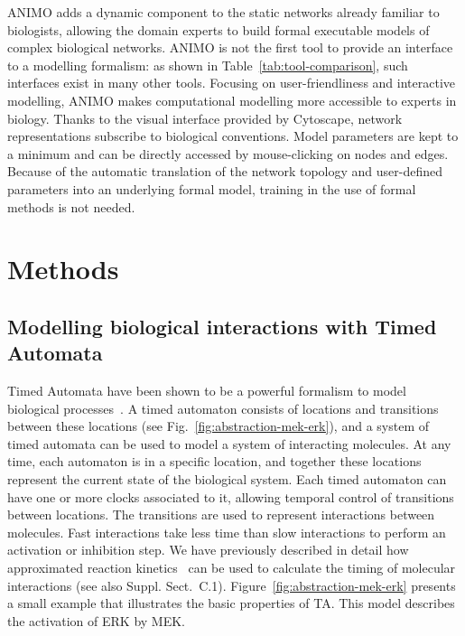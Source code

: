\documentclass{bmcart}
\def\ta{Timed Automaton}
\def\tas{Timed Automata}
\begin{document}
ANIMO adds a dynamic component to the static networks already familiar to biologists,
allowing the domain experts to build formal executable models of complex biological networks.
ANIMO is not the first tool to provide an interface to a
modelling formalism: as shown in Table~\ref{tab:tool-comparison}, such interfaces exist in many other tools.
Focusing on user-friendliness and interactive modelling, ANIMO
makes computational modelling more accessible to experts in biology.
Thanks to the visual
interface provided by Cytoscape, network representations subscribe to biological conventions.
Model parameters are kept to a minimum and can be directly accessed by mouse-clicking on
nodes and edges. Because of the automatic translation of the network topology and
user-defined parameters into an underlying formal model, training in the use of formal methods
is not needed.







\section*{Methods}

\subsection*{Modelling biological interactions with Timed Automata}\label{subsec:timed-automata}
\def\ta{TA}
\def\tas{TA}

Timed Automata have been shown to be a powerful formalism to model biological
processes~\cite{ta-siebert,bartocci-oscillators,oded-ode-ta-discretization}. A timed automaton consists of locations
and transitions between these locations (see Fig.~\ref{fig:abstraction-mek-erk}), and a system of timed automata can be
used to model a system of interacting molecules. At any time, each automaton is in a specific location, and together
these locations represent the current state of the biological system. Each timed automaton can have one or more clocks
associated to it, allowing temporal control of transitions between locations. The transitions are used to
represent interactions between molecules. Fast interactions take less time than slow interactions
to perform an activation or inhibition step. We have previously described in detail how approximated
reaction kinetics~\cite{animo-ieee} can be used to calculate the timing of molecular
interactions (see also Suppl. Sect.~C.1). %
Figure~\ref{fig:abstraction-mek-erk}
presents a small example that illustrates the basic properties of \tas.
This model describes the activation of ERK by MEK.
\end{document}
